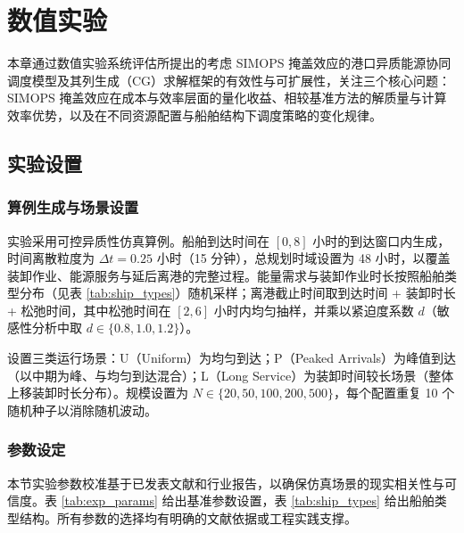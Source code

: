 \documentclass[UTF8, a4paper, 12pt]{ctexart}
\theoremstyle{plain}
\theoremstyle{definition}
\theoremstyle{remark}
\begin{document}

\section{数值实验}
\label{sec:computational}

本章通过数值实验系统评估所提出的考虑 SIMOPS 掩盖效应的港口异质能源协同调度模型及其列生成（CG）求解框架的有效性与可扩展性，关注三个核心问题：SIMOPS 掩盖效应在成本与效率层面的量化收益、相较基准方法的解质量与计算效率优势，以及在不同资源配置与船舶结构下调度策略的变化规律。

\subsection{实验设置}
\label{sec:exp_setup}

\subsubsection{算例生成与场景设置}
\label{sec:data_instances}
实验采用可控异质性仿真算例。船舶到达时间在 $[0,8]$ 小时的到达窗口内生成，时间离散粒度为 $\Delta t=0.25$ 小时（15 分钟），总规划时域设置为 48 小时，以覆盖装卸作业、能源服务与延后离港的完整过程。能量需求与装卸作业时长按照船舶类型分布（见表 \ref{tab:ship_types}）随机采样；离港截止时间取到达时间 + 装卸时长 + 松弛时间，其中松弛时间在 $[2,6]$ 小时内均匀抽样，并乘以紧迫度系数 $d$（敏感性分析中取 $d\in\{0.8,1.0,1.2\}$）。

设置三类运行场景：U（Uniform）为均匀到达；P（Peaked Arrivals）为峰值到达（以中期为峰、与均匀到达混合）；L（Long Service）为装卸时间较长场景（整体上移装卸时长分布）。规模设置为 $N\in\{20,50,100,200,500\}$，每个配置重复 10 个随机种子以消除随机波动。

\subsubsection{参数设定}
\label{sec:parameter_setting}

本节实验参数校准基于已发表文献和行业报告，以确保仿真场景的现实相关性与可信度。表 \ref{tab:exp_params} 给出基准参数设置，表 \ref{tab:ship_types} 给出船舶类型结构。所有参数的选择均有明确的文献依据或工程实践支撑。
\end{document}
